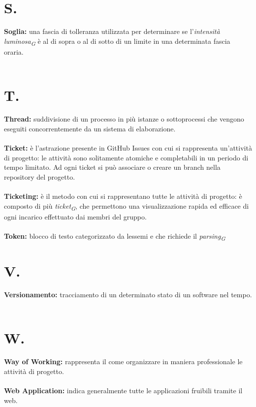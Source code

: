\documentclass[a4paper, 12pt]{article}
\begin{document}
\newpage
\section*{S.}
\textbf{Soglia:} una fascia di tolleranza utilizzata per determinare se l'\textit{intensità luminosa\textsubscript{G}} è al di sopra o al di sotto di un limite in una determinata fascia oraria. \\ \\

\newpage
\section*{T.}
\textbf{Thread:} suddivisione di un processo in più istanze o sottoprocessi che vengono eseguiti concorrentemente da un sistema di elaborazione. \\ \\
\textbf{Ticket:} è l'astrazione presente in GitHub Issues con cui si rappresenta
un'attività di progetto: le attività sono solitamente atomiche e completabili in
un periodo di tempo limitato. Ad ogni ticket si può associare o creare un branch
nella repository del progetto.\\ \\
\textbf{Ticketing:} è il metodo con cui si rappresentano tutte le attività di
progetto: è composto di più \textit{ticket\textsubscript{G}}, che permettono una visualizzazione rapida ed
efficace di ogni incarico effettuato dai membri del gruppo. \\ \\
\textbf{Token:} blocco di testo categorizzato da lessemi e che richiede il \textit{parsing\textsubscript{G}}
\newpage
\section*{V.}
\textbf{Versionamento:} tracciamento di un determinato stato di un software nel tempo. \\ \\

\newpage
\section*{W.}
\textbf{Way of Working:} rappresenta il come organizzare in maniera professionale le attività di progetto.\\ \\
\textbf{Web Application:} indica generalmente tutte le applicazioni fruibili tramite il web.
\end{document}
